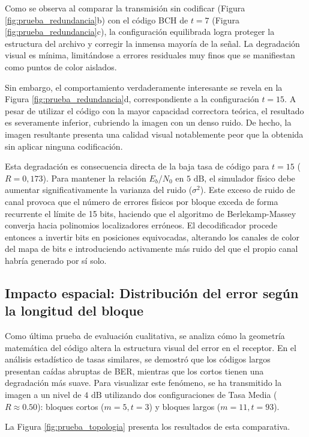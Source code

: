 Como se observa al comparar la transmisión sin codificar (Figura \ref{fig:prueba_redundancia}b) con el código BCH de $t=7$ (Figura \ref{fig:prueba_redundancia}c), la configuración equilibrada logra proteger la estructura del archivo y corregir la inmensa mayoría de la señal. La degradación visual es mínima, limitándose a errores residuales muy finos que se manifiestan como puntos de color aislados. 

Sin embargo, el comportamiento verdaderamente interesante se revela en la Figura \ref{fig:prueba_redundancia}d, correspondiente a la configuración $t=15$. A pesar de utilizar el código con la mayor capacidad correctora teórica, el resultado es severamente inferior, cubriendo la imagen con un denso ruido. De hecho, la imagen resultante presenta una calidad visual notablemente peor que la obtenida sin aplicar ninguna codificación.

Esta degradación es consecuencia directa de la baja tasa de código para $t=15$ ($R=0,173$). Para mantener la relación $E_b/N_0$ en $5\text{ dB}$, el simulador físico debe aumentar significativamente la varianza del ruido ($\sigma^2$). Este exceso de ruido de canal provoca que el número de errores físicos por bloque exceda de forma recurrente el límite de 15 bits, haciendo que el algoritmo de Berlekamp-Massey converja hacia polinomios localizadores erróneos. El decodificador procede entonces a invertir bits en posiciones equivocadas, alterando los canales de color del mapa de bits e introduciendo activamente más ruido del que el propio canal habría generado por sí solo.

\subsection{Impacto espacial: Distribución del error según la longitud del bloque}

Como última prueba de evaluación cualitativa, se analiza cómo la geometría matemática del código altera la estructura visual del error en el receptor. En el análisis estadístico de tasas similares, se demostró que los códigos largos presentan caídas abruptas de BER, mientras que los cortos tienen una degradación más suave. Para visualizar este fenómeno, se ha transmitido la imagen a un nivel de $4\text{ dB}$ utilizando dos configuraciones de Tasa Media ($R \approx 0.50$): bloques cortos ($m=5, t=3$) y bloques largos ($m=11, t=93$).

La Figura \ref{fig:prueba_topologia} presenta los resultados de esta comparativa.

